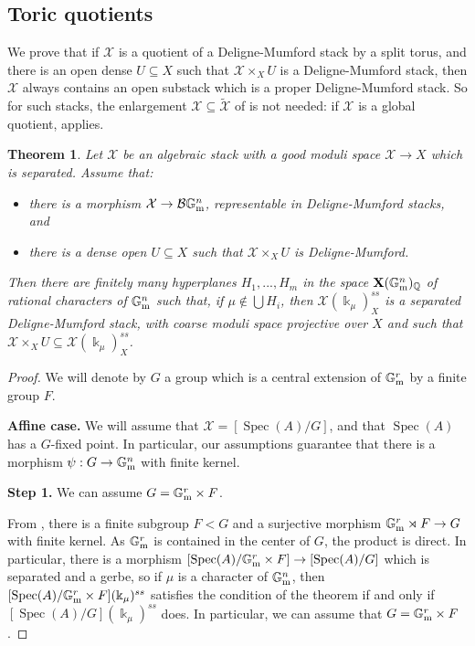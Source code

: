 \documentclass{amsart}
\newcommand{\bG}{\mathbb{G}}
\newcommand{\bQ}{\mathbb{Q}}
\newcommand{\cB}{\mathcal{B}}
\newcommand{\cX}{\mathcal{X}}
\newcommand{\spec}{\operatorname{Spec}}
\newcommand{\Gm}{\bG_{{\rm m}}}
\newtheorem{Teo}[theorem]{Theorem}
\theoremstyle{definition}
\theoremstyle{definition}
\begin{document}
{\subsection{Toric quotients}\label{section_toric_quotients}
We prove that if $\cX$ is a quotient of a Deligne-Mumford stack by a split torus, and there is an open dense $U\subseteq X$ such that $\cX\times_XU$ is a Deligne-Mumford stack, then $\cX$ always contains an open substack which is a proper Deligne-Mumford stack. So for such stacks, the enlargement $\cX\subseteq \widetilde{\cX}$ of  is not needed{: if $\cX$ is a global quotient,  applies}.
\begin{Teo}\label{teo_toric_stack_has_open_dense_dm}
    Let $\cX$ be an algebraic stack with a good moduli space $\cX\to X$ which is separated. Assume that:
    \begin{itemize}
        \item there is a morphism $\cX\to \cB \Gm^n$,
    representable in Deligne-Mumford stacks, and
    \item there is a dense open $U\subseteq  X$ such that $\cX\times_XU$ is Deligne-Mumford.
    \end{itemize} Then there are finitely many hyperplanes $H_1,...,H_m$ in the space $\mathbf{X}(\Gm^n)_\bQ$ of rational characters of $\Gm^n$ such that, if $\mu \notin \bigcup H_i$, then $\cX(\Bbbk_\mu)^{ss}_X$ is a separated Deligne-Mumford stack, with coarse moduli space projective over $X$ and such that $\cX\times_XU\subseteq \cX(\Bbbk_\mu)^{ss}_X$.
\end{Teo}

\begin{proof}
We will denote by $G$ a group which is a central extension of $\Gm^r$ by a finite group $F$. 

\textbf{Affine case.} We will assume that $\cX=[\spec(A)/G]$, and that $\spec(A)$ has a $G$-fixed point. In particular, our assumptions guarantee that there is a morphism $\psi:G\to \Gm^n$ with finite kernel.  

    \textbf{Step 1.} We can assume $G=\Gm^r\times F$.
    
    From \cite{brion2015extensions}, there is a finite subgroup $F<G$ and a surjective morphism $\Gm^r \rtimes F \to G$ with finite kernel. As $\Gm^r$ is contained in the center of $G$, the product is direct. In particular, there is a morphism $[\spec(A)/\Gm^r\times F]\to [\spec(A)/G]$ which is separated and a gerbe, so if $\mu$ is a character of $\Gm^n$, then $[\spec(A)/\Gm^r\times F](\Bbbk_\mu)^{ss}$ satisfies the condition of the theorem if and only if $[\spec(A)/G](\Bbbk_\mu)^{ss}$ does. In particular, we can assume that $G=\Gm^r\times F$.


\end{proof}}
\end{document}
